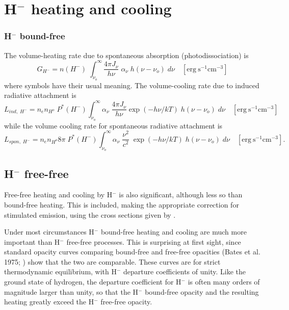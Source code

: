 \section{H$^-$ heating and cooling}

\subsubsection{H$^-$ bound-free}

The volume-heating rate due to spontaneous absorption (photodissociation)
is
\begin{equation}
{G_{{H^ - }}} = n({H^ - })\;\int_{{\nu _o}}^\infty  {\frac{{4\pi {J_\nu
}}}{{h\nu }}} \;{\alpha _\nu }\;h\left( {\nu  - {\nu _o}} \right)\;d\nu
\quad [\mathrm{erg~s}^{-1} \mathrm{cm}^{-3}]
\end{equation}
where symbols have their usual meaning.  The volume-cooling rate due to
induced radiative attachment is
\begin{equation}
{L_{ind,\;{H^ - }}} = {n_e}{n_{{H^o}}}\;{P^*}({H^ - })\int_{{\nu
_o}}^\infty  {{\alpha _\nu }\;\frac{{4\pi {J_\nu }}}{{h\nu }}\exp \left(
{ - h\nu /kT} \right)\;h\left( {\nu  - {\nu _o}} \right)\;d\nu }
\quad [\mathrm{erg~s}^{-1} \mathrm{cm}^{-3}]
\end{equation}
while the volume cooling rate for spontaneous radiative attachment is
\begin{equation}
{L_{spon,\;{H^ - }}} = {n_e}{n_{{H^o}}}8\pi \;{P^*}({H^ - })\int_{{\nu
_o}}^\infty  {{\alpha _\nu }\;\frac{{{\nu ^2}}}{{{c^2}}}\;\exp \left( {
- h\nu /kT} \right)\;h\left( {\nu  - {\nu _o}} \right)\;d\nu }
\quad [\mathrm{erg~s}^{-1} \mathrm{cm}^{-3}].
\end{equation}

\subsection{H$^-$ free-free}

Free-free heating and cooling by H$^-$ is also significant, although less
so than bound-free heating.  This is included, making the appropriate
correction for stimulated emission, using the cross sections given by
\citep{Vernazza1981}.

Under most circumstances H$^-$ bound-free heating and cooling are much more
important than H$^-$ free-free processes.  This is surprising at first sight,
since standard opacity curves comparing bound-free and free-free opacities
(Bates et al. 1975; \citealp{Mihalas1978}) show that the two are comparable.  These
curves are for strict thermodynamic equilibrium, with H$^-$ departure
coefficients of unity.  Like the ground state of hydrogen, the departure
coefficient for H$^-$ is often many orders of magnitude larger than unity,
so that the H$^-$ bound-free opacity and the resulting heating greatly exceed
the H$^-$ free-free opacity.

